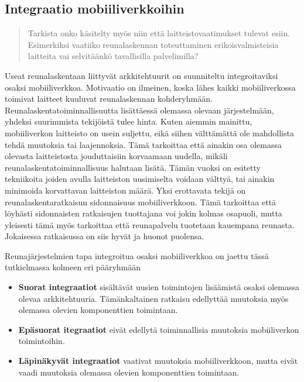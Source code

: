 
\subsection{Integraatio mobiiliverkkoihin}
\begin{quote}
Tarkista onko käsitelty myös niin että laitteistovaatimukset tulevat esiin. Esimerkiksi vaatiiko reunalaskennan toteuttaminen erikoisvalmisteisia laitteita vai selvitäänkö tavallisilla palvelimilla?
\end{quote}


Useat reunalaskentaan liittyvät arkkitehtuurit on suunniteltu integroitaviksi osaksi mobiiliverkkoa.
Motivaatio on ilmeinen, koska lähes kaikki mobiiliverkossa toimivat laitteet kuuluvat reunalaskennan kohderyhmään.
Reunalaskentatoiminnallisuutta lisättäessä olemassa olevaan järjestelmään, yhdeksi suurimmista tekijöistä tulee hinta. 
Kuten aiemmin mainittu, mobiiliverkon laitteisto on usein suljettu, eikä siihen välttämättä ole mahdollista tehdä muutoksia tai laajennoksia.
Tämä tarkoittaa että ainakin osa olemassa olevasta laitteistosta jouduttaisiin korvaamaan uudella, mikäli reunalaskentatoiminnallisuus halutaan lisätä.
Tämän vuoksi on esitetty tekniikoita joiden avulla laitteiston uusimiselta voidaan välttyä, tai ainakin minimoida korvattavan laitteiston määrä.
Yksi erottavata tekijä on reunalaskentaratkaisun sidonnaisuus mobiiliverkkoon. Tämä tarkoittaa että löyhästi sidonnaisten ratkaisujen tuottajana voi jokin kolmas osapuoli, mutta yleisesti tämä myös tarkoittaa että reunapalvelu tuotetaan kauempana reunasta.
Jokaisessa ratkaisussa on siis hyvät ja huonot puolensa. 

Reunajärjestelmien tapa integroitua osaksi mobiiliverkkoa on jaettu tässä tutkielmassa kolmeen eri pääryhmään

\begin{itemize}
\item \textbf{Suorat integraatiot} sisältävät uusien toimintojen lisäämistä osaksi olemassa olevaa arkkitehtuuria. Tämänkaltainen ratkaisu edellyttää muutoksia myös olemassa olevien komponenttien toimintaan. 
\item \textbf{Epäsuorat itegraatiot} eivät edellytä toiminnallisia muutoksia mobiiliverkon toimintoihin.
\item \textbf{Läpinäkyvät integraatiot} vaativat muutoksia mobiiliverkkoon, mutta eivät vaadi muutoksia olemassa olevien komponenttien toimintaan.
\end{itemize}

